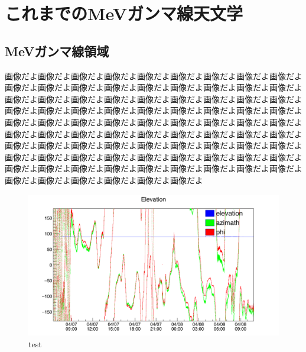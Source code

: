 \section{これまでのMeVガンマ線天文学}
\subsection{MeVガンマ線領域}

画像だよ画像だよ画像だよ画像だよ画像だよ画像だよ画像だよ画像だよ画像だよ画像だよ画像だよ画像だよ画像だよ画像だよ画像だよ画像だよ画像だよ画像だよ画像だよ画像だよ画像だよ画像だよ画像だよ画像だよ画像だよ画像だよ画像だよ画像だよ画像だよ画像だよ画像だよ画像だよ画像だよ画像だよ画像だよ画像だよ画像だよ画像だよ画像だよ画像だよ画像だよ画像だよ画像だよ画像だよ画像だよ画像だよ画像だよ画像だよ画像だよ画像だよ画像だよ画像だよ画像だよ画像だよ画像だよ画像だよ画像だよ画像だよ画像だよ画像だよ画像だよ画像だよ画像だよ画像だよ画像だよ画像だよ画像だよ画像だよ画像だよ画像だよ画像だよ画像だよ画像だよ画像だよ画像だよ画像だよ画像だよ画像だよ画像だよ画像だよ画像だよ画像だよ画像だよ画像だよ画像だよ画像だよ画像だよ
\begin{figure}
\centering
\includegraphics[width=15cm]{attitude_f.png}
\caption{test}
\end{figure}